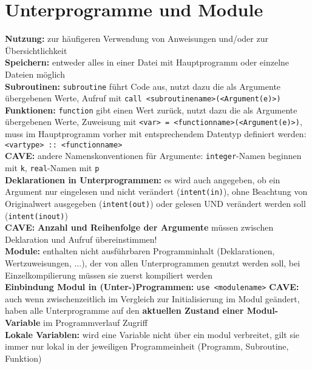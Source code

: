 \documentclass[a4paper, twocolumn]{scrarticle}
\begin{document}
  \section{Unterprogramme und Module}
  \textbf{Nutzung:} zur häufigeren Verwendung von Anweisungen und/oder zur Übersichtlichkeit\\
  \textbf{Speichern:} entweder alles in einer Datei mit Hauptprogramm oder einzelne Dateien möglich\\
  \textbf{Subroutinen:} \lstinline|subroutine| führt Code aus, nutzt dazu die als Argumente übergebenen Werte, Aufruf mit \lstinline|call <subroutinename>(<Argument(e)>)|\\
  \textbf{Funktionen:} \lstinline|function| gibt einen Wert zurück, nutzt dazu die als Argumente übergebenen Werte, Zuweisung mit \lstinline|<var> = <functionname>(<Argument(e)>)|, muss im Hauptprogramm vorher mit entsprechendem Datentyp definiert werden: \lstinline|<vartype> :: <functionname>|\\
  \textbf{CAVE:} andere Namenskonventionen für Argumente: \lstinline|integer|-Namen beginnen mit \lstinline|k|, \lstinline|real|-Namen mit \lstinline|p|\\
  \textbf{Deklarationen in Unterprogrammen:}  es wird auch angegeben, ob ein Argument nur eingelesen und nicht verändert (\lstinline|intent(in)|), ohne Beachtung von Originalwert ausgegeben (\lstinline|intent(out)|) oder gelesen UND verändert werden soll (\lstinline|intent(inout)|)\\
  \textbf{CAVE:} \textbf{Anzahl und Reihenfolge der Argumente} müssen zwischen Deklaration und Aufruf übereinstimmen!\\
  \textbf{Module:} enthalten nicht ausführbaren  Programminhalt (Deklarationen, Wertzuweisungen, ...), der von allen Unterprogrammen genutzt werden soll, bei Einzelkompilierung müssen sie zuerst kompiliert werden\\
  \textbf{Einbindung Modul in (Unter-)Programmen:} \lstinline|use <modulename>|
  \textbf{CAVE:} auch wenn zwischenzeitlich im Vergleich zur Initialisierung im Modul geändert, haben alle Unterprogramme auf den \textbf{aktuellen Zustand einer Modul-Variable} im Programmverlauf Zugriff\\
  \textbf{Lokale Variablen:} wird eine Variable nicht über ein modul \glqq verbreitet\grqq, gilt sie immer nur lokal in der jeweiligen Programmeinheit (Programm, Subroutine, Funktion)
\end{document}
